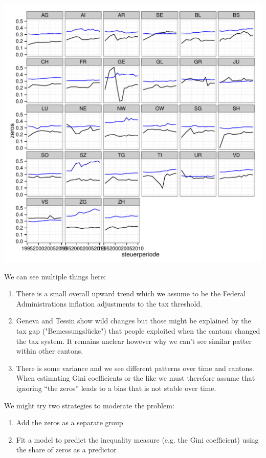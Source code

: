 \documentclass[twoside]{article}\usepackage[]{graphicx}\usepackage[]{color}
\makeatletter
\def\maxwidth{ %
  \ifdim\Gin@nat@width>\linewidth
    \linewidth
  \else
    \Gin@nat@width
  \fi
}
\newenvironment{knitrout}{}{} %
\makeatother
\begin{document}
\begin{multicols}{2}
\begin{knitrout}
\includegraphics[width=\maxwidth]{figure/zero_descriptives2} 

\end{knitrout}


We can see multiple things here:

\begin{enumerate}
\item There is a small overall upward trend which we assume to be the Federal Administrations inflation adjustments to the tax threshold.
\item Geneva and Tessin show wild changes but those might be explained by the tax gap ("Bemessungslücke") that people exploited when the cantons changed the tax system. It remains unclear however why we can't see similar patter within other cantons.
\item There is some variance and we see different patterns over time and cantons. When estimating Gini coefficients or the like we must therefore assume that ignoring ``the zeros'' leads to a bias that is not stable over time.
\end{enumerate}

We might try two strategies to moderate the problem:

\begin{enumerate}
\item Add the zeros as a separate group
\item Fit a model to predict the inequality measure (e.g. the Gini coefficient) using the share of zeros as a predictor
\end{enumerate}


\end{multicols}
\end{document}
